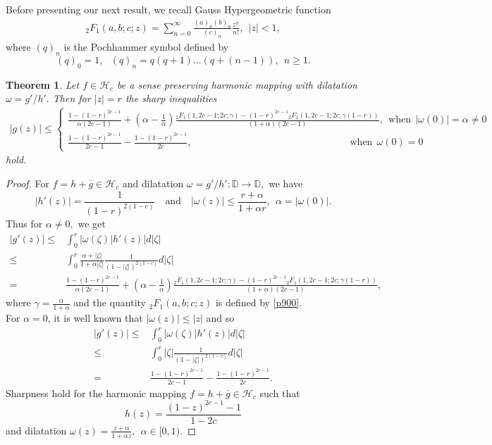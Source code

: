 \documentclass[a4paper,12pt]{amsart}
\newtheorem{thm}{Theorem}[section]
\theoremstyle{definition}
\newcounter {own}
\begin{document}
Before presenting our next result, we recall Gauss Hypergeometric function
\begin{align}\label{p900}
	{}_2F_1(a,b;c;z)=\sum\limits_{n=0}^\infty\frac{(a)_n(b)_n}{(c)_n}\frac{z^n}{n!},~~|z|<1,
\end{align}
	where $(q)_n$ is the Pochhammer symbol defined by
	$$(q)_0=1,~~~(q)_n=q(q+1)\dots (q+(n-1)),~~n\ge 1.$$
	
	
	

	\begin{thm}\label{log-000200}
		Let $f\in\mathcal{H}_c$ be a sense preserving harmonic mapping with dilatation $\omega=g'/h'.$ Then for $|z|=r$ the sharp inequalities
		\begin{align*}
			|g(z)|\le
			\begin{cases}
				\frac{1-(1-r)^{2c-1}}{\alpha(2c-1)}+(\alpha-\frac{1}{\alpha})\frac{{}_2F_1(1,2c-1;2c;\gamma)-(1-r)^{2c-1}{}_2F_1(1,2c-1;2c;\gamma(1-r))}{(1+\alpha)(2c-1)} ,~~\text{when}~~|\omega(0)|=\alpha\neq 0 \\
				 \frac{1-(1-r)^{2c-1}}{2c-1}-\frac{1-(1-r)^{2c-1}}{2c},\quad\quad\quad\quad\quad\quad\quad\quad\quad\quad\quad\quad\quad\quad\quad\quad\text{when}~~\omega(0)=0
			\end{cases}
		\end{align*}
		hold.
	\end{thm}
	\begin{proof}
	For $f=h+\overline{g}\in\mathcal{H}_c$ and dilatation $\omega=g'/h' :\mathbb{D}\rightarrow\mathbb{D},$ we have 
	$$|h'(z)|=\frac{1}{(1-r)^{2(1-c)}}\quad\text{and}\quad |\omega(z)|\le\frac{r+\alpha}{1+\alpha r},~~\alpha=|\omega(0)|.$$
	Thus for $\alpha\neq 0,$ we get
	\begin{align*}
	|g'(z)|\le  & \int_{0}^{r}|\omega(\zeta)|h'(z)|d|\zeta|\\
	\le & \int_{0}^{r}\frac{\alpha+|\zeta|}{1+\alpha|\zeta|}\frac{1}{(1-|\zeta|)^{2(1-c)}}d|\zeta|\\
	=&\frac{1-(1-r)^{2c-1}}{\alpha(2c-1)}+(\alpha-\frac{1}{\alpha})\frac{{}_2F_1(1,2c-1;2c;\gamma)-(1-r)^{2c-1}{}_2F_1(1,2c-1;2c;\gamma(1-r))}{(1+\alpha)(2c-1)},
	\end{align*}
	where $\gamma=\frac{\alpha}{1+\alpha}$ and the quantity ${}_2F_1(a,b;c;z)$ is defined by \eqref{p900}.\\
	
	 For $\alpha=0$, it is well known that $|\omega(z)|\le|z|$ and so
	\begin{align*}
	|g'(z)|\le  & \int_{0}^{r}|\omega(\zeta)|h'(z)|d|\zeta|\\
	\le & \int_{0}^{r}|\zeta|\frac{1}{(1-|\zeta|)^{2(1-c)}}d|\zeta|\\
	=&\frac{1-(1-r)^{2c-1}}{2c-1}-\frac{1-(1-r)^{2c-1}}{2c}.
	\end{align*}
	Sharpness hold for the harmonic mapping $f=h+\overline{g}\in\mathcal{H}_c$ such that
	$$h(z)=\frac{(1-z)^{2c-1}-1}{1-2c}$$ and dilatation $\omega(z)=\frac{z+\alpha}{1+\alpha z},~~\alpha\in[0,1)$.
	
	\end{proof}
\end{document}
